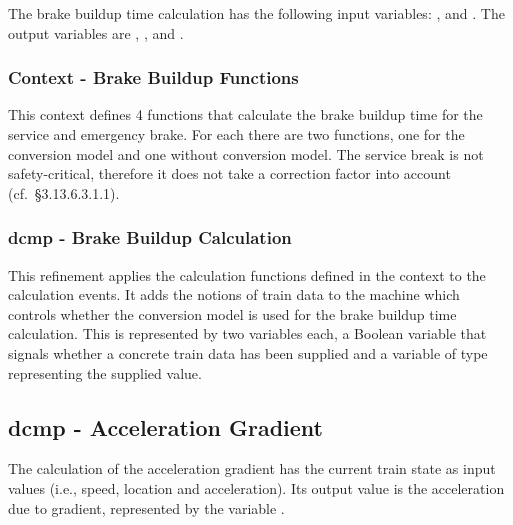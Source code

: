 \documentclass{template/openetcs_article}
\begin{document}
{The brake buildup time calculation has the following input variables:
,  and . The output
variables are , ,  and
.

{\footnotesize

}

\subsubsection{Context - Brake Buildup Functions}
\label{sec:cont-brake-build}

This context defines 4 functions that calculate the brake buildup time for the
service and emergency brake. For each there are two functions, one for the
conversion model and one without conversion model. The service break is not
safety-critical, therefore it does not take a correction factor into account
(cf.~§3.13.6.3.1.1).




\subsubsection{dcmp - Brake Buildup Calculation}
\label{sec:dcmp-brake-buildup-1}

This refinement applies the calculation functions defined in the context to the
calculation events. It adds the notions of train data to the machine which
controls whether the conversion model is used for the brake buildup time
calculation. This is represented by two variables each, a Boolean variable that
signals whether a concrete train data has been supplied and a variable of type
 representing the supplied value.

{\footnotesize

}

\subsection{dcmp - Acceleration Gradient}
\label{sec:dcmp-accel-grad}

The calculation of the acceleration gradient has the current train state as
input values (i.e., speed, location and acceleration). Its output value is the
acceleration due to gradient, represented by the variable .

{\footnotesize

}


}
\end{document}
